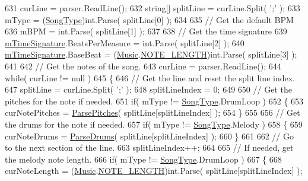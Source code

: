 \begin{DoxyCodeInclude}
631         curLine = parser.ReadLine();
632         \textcolor{keywordtype}{string}[] splitLine = curLine.Split( \textcolor{charliteral}{';'} );
633         mType = (\hyperlink{group___song_enums_gae681a1f001333e39fc1cb4fea97bfe1b}{SongType})\textcolor{keywordtype}{int}.Parse( splitLine[0] );
634 
635         \textcolor{comment}{// Get the default BPM}
636         mBPM = \textcolor{keywordtype}{int}.Parse( splitLine[1] );
637 
638         \textcolor{comment}{// Get the time signature}
639         \hyperlink{group___song_priv_var_ga2b2dcc0e83e49f7303b6a1371877b25e}{mTimeSignature}.BeatsPerMeasure = \textcolor{keywordtype}{int}.Parse( splitLine[2] );
640         \hyperlink{group___song_priv_var_ga2b2dcc0e83e49f7303b6a1371877b25e}{mTimeSignature}.BaseBeat = (\hyperlink{class_music}{Music}.\hyperlink{group___music_enums_gaf11b5f079adbb21c800b9eca1c5c3cbd}{NOTE\_LENGTH})\textcolor{keywordtype}{int}.Parse( splitLine[3] 
      );
641 
642         \textcolor{comment}{// Get the notes of the song.}
643         curLine = parser.ReadLine();
644         \textcolor{keywordflow}{while}( curLine != null )
645         \{
646             \textcolor{comment}{// Get the line and reset the split line index.}
647             splitLine = curLine.Split( \textcolor{charliteral}{';'} );
648             splitLineIndex = 0;
649 
650             \textcolor{comment}{// Get the pitches for the note if needed.}
651             \textcolor{keywordflow}{if}( mType != \hyperlink{group___song_enums_gae681a1f001333e39fc1cb4fea97bfe1b}{SongType}.DrumLoop )
652             \{
653                 curNotePitches = \hyperlink{group___song_priv_func_gacf6fee93921e1a5edbc477c0898c357a}{ParsePitches}( splitLine[splitLineIndex] );
654             \}
655 
656             \textcolor{comment}{// Get the drums for the note if needed.}
657             \textcolor{keywordflow}{if}( mType != \hyperlink{group___song_enums_gae681a1f001333e39fc1cb4fea97bfe1b}{SongType}.Melody )
658             \{
659                 curNoteDrums = \hyperlink{group___song_priv_func_gaaa4ca12f0885a34cbfb09bb7a1db178b}{ParseDrums}( splitLine[splitLineIndex] );
660             \}
661 
662             \textcolor{comment}{// Go to the next section of the line.}
663             splitLineIndex++;
664 
665             \textcolor{comment}{// If needed, get the melody note length.}
666             \textcolor{keywordflow}{if}( mType != \hyperlink{group___song_enums_gae681a1f001333e39fc1cb4fea97bfe1b}{SongType}.DrumLoop )
667             \{
668                 curNoteLength = (\hyperlink{class_music}{Music}.\hyperlink{group___music_enums_gaf11b5f079adbb21c800b9eca1c5c3cbd}{NOTE\_LENGTH})\textcolor{keywordtype}{int}.Parse( splitLine[splitLineIndex] );

\end{DoxyCodeInclude}
